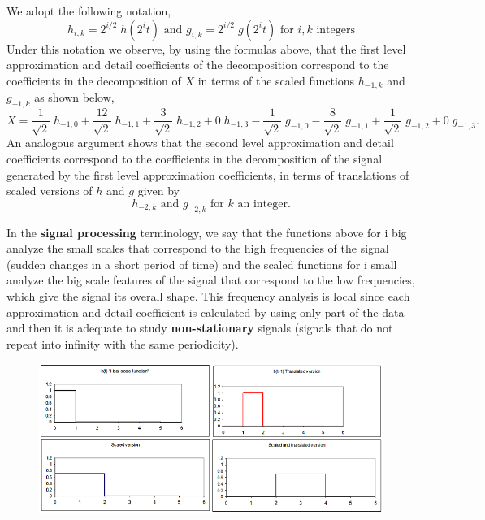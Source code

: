 We adopt the following notation,
	\[
	h_{i,k}=2^{i/2} \; h(2^it) \text{ and } g_{i,k}=2^{i/2}\; g(2^it) \text{ for }i,k \text{ integers}
	\]
Under this notation we observe, by using the formulas above, that the first level approximation and detail coefficients of the decomposition correspond to the coefficients in the decomposition of $X$ in terms of the scaled functions $h_{-1,k}$ and $g_{-1,k}$ as shown below,
	\[
	X= \frac{1}{\sqrt{2}}\; h_{-1,0} + \frac{12}{\sqrt{2}}\; h_{-1,1} + \frac{3}{\sqrt{2}}\; h_{-1,2} + 0 \; h_{-1,3} - \frac{1}{\sqrt{2}}\; g_{-1,0} - \frac{8}{\sqrt{2}}\; g_{-1,1} + \frac{1}{\sqrt{2}}\; g_{-1,2} + 0\; g_{-1,3}.
	\]
An analogous argument shows that the second level approximation and detail coefficients correspond to the coefficients in the decomposition of the signal generated by the first level approximation coefficients, in terms of translations of scaled versions of $h$ and $g$ given by 
	\[
	h_{-2,k} \text{ and } g_{-2,k} \text{ for } k \text{ an integer}.
	\]


In the \textbf{signal processing} terminology, we say that the functions above for i big analyze the small scales that correspond to the high frequencies of the signal (sudden changes in a short period of time) and the scaled functions for i small analyze the big scale features of the signal that correspond to the low frequencies, which give the signal its overall shape. This frequency analysis is local since each approximation and detail coefficient is calculated by using only part of the data and then it is adequate to study \textbf{non-stationary} signals (signals that do not repeat into infinity with the same periodicity).



	\begin{figure}[H]
   	\centering
   	\includegraphics[width=\textwidth]{../sections/seasons/season1/107/images/haar.png} 
	\end{figure}

